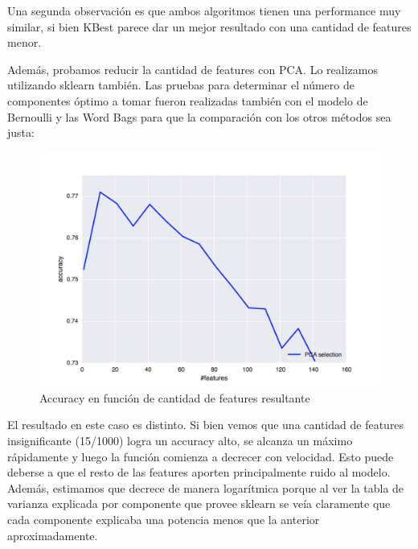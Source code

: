 Una segunda observación es que ambos algoritmos tienen una performance muy similar, si bien KBest parece dar un mejor resultado con una cantidad
de features menor.

Además, probamos reducir la cantidad de features con PCA. Lo realizamos utilizando sklearn también. Las pruebas para determinar el número
de componentes óptimo a tomar fueron realizadas también con el modelo de Bernoulli y las Word Bags para que la comparación con los otros métodos
sea justa:

\begin{figure}[H]
	\includegraphics[scale=0.2]{figures/bernoulli_pca.jpg}
	\caption{Accuracy en función de cantidad de features resultante}
\end{figure}

El resultado en este caso es distinto. Si bien vemos que una cantidad de features insignificante (15/1000) logra un accuracy alto, se alcanza
un máximo rápidamente y luego la función comienza a decrecer con velocidad. Esto puede deberse a que el resto de las features aporten principalmente
ruido al modelo. Además, estimamos que decrece de manera logarítmica porque al ver la tabla de varianza explicada por componente que provee sklearn
se veía claramente que cada componente explicaba una potencia menos que la anterior aproximadamente.
